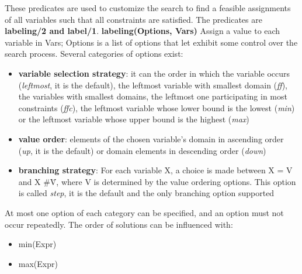 These predicates are used to customize the search to find a feasible assignments of all variables such that all constraints are satisfied.\newline
The predicates are \textbf{labeling/2 and label/1}.\newline\newline
\textbf{labeling(Options, Vars)}\newline\newline
Assign a value to each variable in Vars; Options is a list of options that let exhibit some control over the search process. Several categories of options exist:\newline
\begin{itemize}
    \item \textbf{variable selection strategy}: it can the order in which the variable occurs (\textit{leftmost}, it is the default), the leftmost variable with smallest domain (\textit{ff}), the variables with smallest domains, the leftmost one participating in most constraints (\textit{ffc}), the leftmost variable whose lower bound is the lowest (\textit{min}) or the leftmost variable whose upper bound is the highest (\textit{max})
    \item \textbf{value order}: elements of the chosen variable's domain in ascending order (\textit{up}, it is the default) or domain elements in descending order (\textit{down})
    \item \textbf{branching strategy}: For each variable X, a choice is made between X = V and X \#\= V, where V is determined by the value ordering options. This option is called \textit{step}, it is the default and the only branching option supported
\end{itemize}

At most one option of each category can be specified, and an option must not occur repeatedly.\newline
The order of solutions can be influenced with:\newline
\begin{itemize}
    \item min(Expr)
    \item max(Expr)
\end{itemize}

